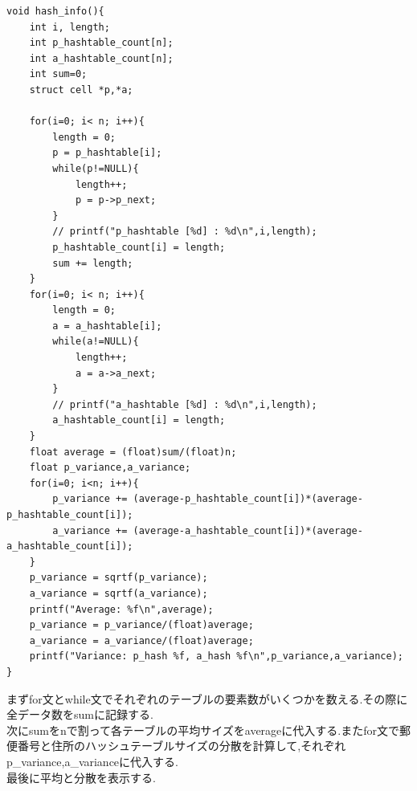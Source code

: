 \documentclass{jsarticle}
\begin{document}
\begin{lstlisting}[caption = kadai.c hash\_info]
void hash_info(){
    int i, length;
    int p_hashtable_count[n];
    int a_hashtable_count[n];
    int sum=0;
    struct cell *p,*a;

    for(i=0; i< n; i++){
        length = 0;
        p = p_hashtable[i];
        while(p!=NULL){
            length++;
            p = p->p_next;
        }
        // printf("p_hashtable [%d] : %d\n",i,length);
        p_hashtable_count[i] = length;
        sum += length;
    }
    for(i=0; i< n; i++){
        length = 0;
        a = a_hashtable[i];
        while(a!=NULL){
            length++;
            a = a->a_next;
        }
        // printf("a_hashtable [%d] : %d\n",i,length);
        a_hashtable_count[i] = length;
    }
    float average = (float)sum/(float)n;
    float p_variance,a_variance;
    for(i=0; i<n; i++){
        p_variance += (average-p_hashtable_count[i])*(average-p_hashtable_count[i]);
        a_variance += (average-a_hashtable_count[i])*(average-a_hashtable_count[i]);
    }
    p_variance = sqrtf(p_variance);
    a_variance = sqrtf(a_variance);
    printf("Average: %f\n",average);
    p_variance = p_variance/(float)average;
    a_variance = a_variance/(float)average;
    printf("Variance: p_hash %f, a_hash %f\n",p_variance,a_variance);
}
\end{lstlisting}
まずfor文とwhile文でそれぞれのテーブルの要素数がいくつかを数える.その際に全データ数をsumに記録する.\\
次にsumをnで割って各テーブルの平均サイズをaverageに代入する.またfor文で郵便番号と住所のハッシュテーブルサイズの分散を計算して,それぞれp\_variance,a\_varianceに代入する.\\
最後に平均と分散を表示する.\\
\end{document}

